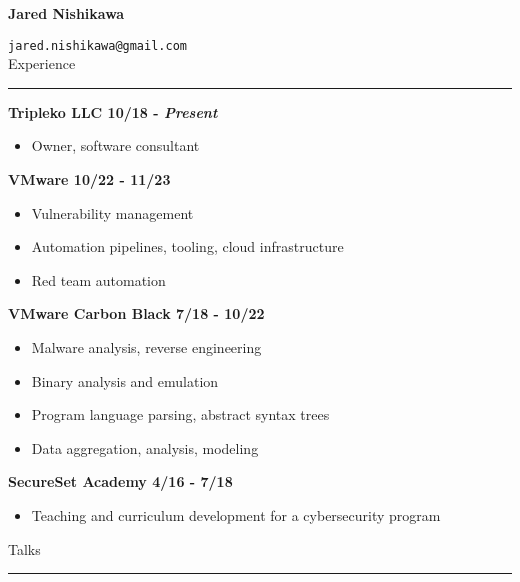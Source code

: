 \documentclass{letter}
\begin{document}
\newcommand{\vspc}{\vskip5mm}


\textbf{\Huge{Jared Nishikawa}}

\texttt{jared.nishikawa@gmail.com} \\


\large{Experience}
\hrule

\textbf{Tripleko LLC \hfill 10/18 - \textit{Present}}
\begin{itemize}
    \setlength\itemsep{-0.5em}
    \item Owner, software consultant
\end{itemize}
\textbf{VMware \hfill 10/22 - 11/23}
\begin{itemize}
    \setlength\itemsep{-0.5em}
    \item Vulnerability management
    \item Automation pipelines, tooling, cloud infrastructure
    \item Red team automation
\end{itemize}

\textbf{VMware Carbon Black \hfill 7/18 - 10/22}
\begin{itemize}
    \setlength\itemsep{-0.5em}
    \item Malware analysis, reverse engineering
    \item Binary analysis and emulation
    \item Program language parsing, abstract syntax trees
    \item Data aggregation, analysis, modeling
\end{itemize}

\textbf{SecureSet Academy \hfill 4/16 - 7/18}
\begin{itemize}
    \setlength\itemsep{-0.5em}
    \item Teaching and curriculum development for a cybersecurity program
\end{itemize}

\vspc



\large{Talks}
\vskip1mm
\hrule
\end{document}
